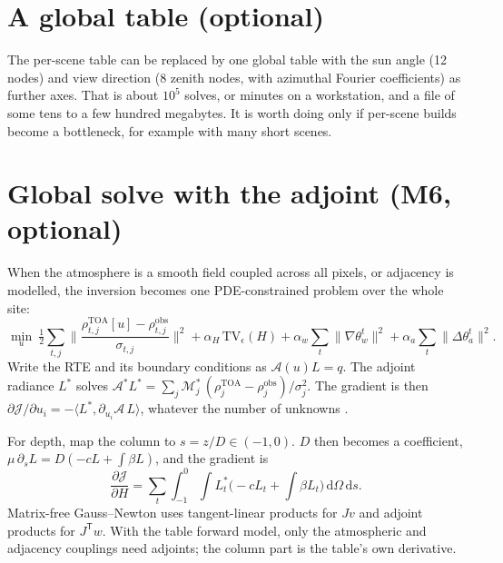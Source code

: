 \documentclass[11pt]{article}
\numberwithin{equation}{section}
\newcommand{\rTOA}{\rho^{\mathrm{TOA}}}
\newcommand{\robs}{\rho^{\mathrm{obs}}}
\newcommand{\dd}{\,\mathrm{d}}
\begin{document}
\appendix
\section{A global table (optional)}\label{app:global}

The per-scene table can be replaced by one global table with the sun angle (12 nodes) and view
direction (8 zenith nodes, with azimuthal Fourier coefficients) as further axes. That is about
$10^5$ solves, or minutes on a workstation, and a file of some tens to a few hundred megabytes.
It is worth doing only if per-scene builds become a bottleneck, for example with many short
scenes.

\section{Global solve with the adjoint (M6, optional)}\label{app:adjoint}

When the atmosphere is a smooth field coupled across all pixels, or adjacency is modelled,
the inversion becomes one PDE-constrained problem over the whole site:
\begin{equation}
\min_{u}\ \tfrac12\sum_{t,j}\Big\|\frac{\rTOA_{t,j}[u]-\robs_{t,j}}{\sigma_{t,j}}\Big\|^2
 + \alpha_H\,\mathrm{TV}_\epsilon(H) + \alpha_w\sum_t\|\nabla\theta^t_w\|^2 + \alpha_a\sum_t\|\Delta\theta^t_a\|^2.
\end{equation}
Write the RTE and its boundary conditions as $\mathcal{A}(u)L = q$. The adjoint radiance $L^*$
solves $\mathcal{A}^*L^* = \sum_j\mathcal{M}_j^*\,(\rTOA_j-\robs_j)/\sigma_j^2$. The gradient
is then $\partial\mathcal{J}/\partial u_i = -\langle L^*,\partial_{u_i}\mathcal{A}\,L\rangle$,
whatever the number of unknowns \cite{box1988,hinze2009}.

For depth, map the column to $s = z/D\in(-1,0)$. $D$ then becomes a coefficient,
$\mu\,\partial_sL = D(-cL + \int\beta L)$, and the gradient is
\begin{equation}
\frac{\partial\mathcal{J}}{\partial H} = \sum_t\int_{-1}^{0}\!\!\int L_t^{*}\Big(-cL_t + \int\beta L_t\Big)\dd\Omega\dd s.
\end{equation}
Matrix-free Gauss--Newton uses tangent-linear products for $Jv$ and adjoint products for
$J^{\mathsf T}w$. With the table forward model, only the atmospheric and adjacency couplings
need adjoints; the column part is the table's own derivative.
\end{document}
